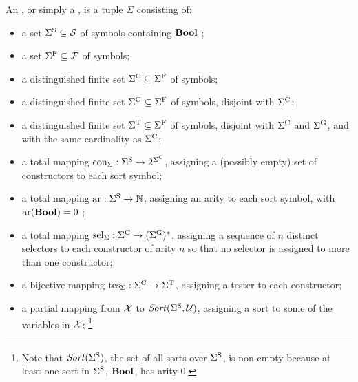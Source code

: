 \begin{definition}
\label{def:signature}
An , or simply a ,
is a tuple $\Sigma$ consisting of:

\begin{itemize}
\item
a set $\Sigma^\mathrm{S} \subseteq \mathcal{S}$ of  symbols containing $\textbf{Bool}$ ;

\item
a set $\Sigma^\mathrm{F} \subseteq \mathcal{F}$ of  symbols;

\item
a distinguished finite set $\Sigma^\mathrm{C} \subseteq \Sigma^\mathrm{F}$ 
of  symbols;

\item
a distinguished finite set $\Sigma^\mathrm{G} \subseteq \Sigma^\mathrm{F}$ 
of  symbols,
disjoint with $\Sigma^\mathrm{C}$;

\item
a distinguished finite set $\Sigma^\mathrm{T} \subseteq \Sigma^\mathrm{F}$ 
of  symbols,
disjoint with $\Sigma^\mathrm{C}$ and $\Sigma^\mathrm{G}$, and with the same cardinality
as $\Sigma^\mathrm{C}$;

\item
a total mapping $\mathrm{con}_\Sigma:\Sigma^\mathrm{S} \to 2^{\Sigma^\mathrm{C}}$,
assigning a (possibly empty) set of constructors to each sort symbol;

\item
a total mapping $\mathrm{ar}:\Sigma^\mathrm{S} \to \mathbb{N}$,
assigning an arity to each sort symbol,
with $\mathrm{ar}(\textbf{Bool}) = 0$ ;

\item
a total mapping $\mathrm{sel}_\Sigma:\Sigma^\mathrm{C} \to (\Sigma^\mathrm{G})^*$,
assigning a sequence of $n$ distinct selectors to each constructor of arity $n$
so that no selector is assigned to more than one constructor;

\item
a bijective mapping $\mathrm{tes}_\Sigma:\Sigma^\mathrm{C} \to \Sigma^\mathrm{T}$,
assigning a tester to each constructor;

\item
a partial mapping from $\mathcal{X}$ to $\mathit{Sort}(\Sigma^\mathrm{S}, \mathcal{U})$,
assigning a sort to some of the variables in $\mathcal{X}$;%
\footnote{%
Note that $\mathit{Sort}(\Sigma^\mathrm{S})$, the set of all sorts over $\Sigma^\mathrm{S}$, is 
non-empty because at least one sort in $\Sigma^\mathrm{S}$, $\textbf{Bool}$, has arity 0.
}


\end{itemize}
\end{definition}
